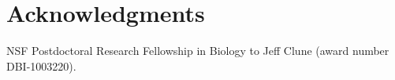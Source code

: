 \section{Acknowledgments}
NSF Postdoctoral Research Fellowship in Biology to Jeff Clune (award number DBI-1003220). 


